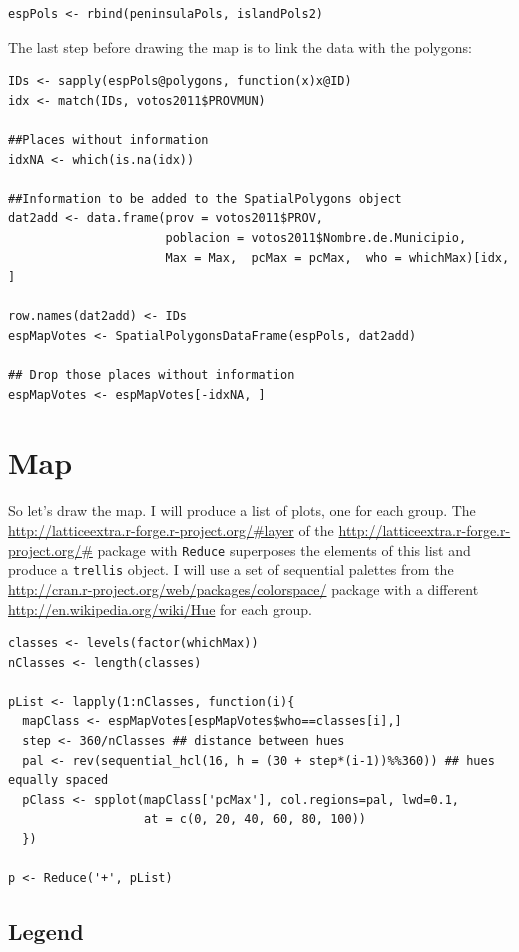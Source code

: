 \lstset{language=R}
\begin{lstlisting}
espPols <- rbind(peninsulaPols, islandPols2)
\end{lstlisting}

The last step before drawing the map is to link the data
with the polygons:

\lstset{language=R}
\begin{lstlisting}
IDs <- sapply(espPols@polygons, function(x)x@ID)
idx <- match(IDs, votos2011$PROVMUN)

##Places without information
idxNA <- which(is.na(idx))

##Information to be added to the SpatialPolygons object
dat2add <- data.frame(prov = votos2011$PROV,
                      poblacion = votos2011$Nombre.de.Municipio,
                      Max = Max,  pcMax = pcMax,  who = whichMax)[idx, ]

row.names(dat2add) <- IDs
espMapVotes <- SpatialPolygonsDataFrame(espPols, dat2add)

## Drop those places without information
espMapVotes <- espMapVotes[-idxNA, ]
\end{lstlisting}
\section{Map}
\label{sec-3}

So let's draw the map. I will produce a list of plots, one for
each group.  The \url{http://latticeextra.r-forge.r-project.org/#layer} of the \url{http://latticeextra.r-forge.r-project.org/#} package
with \texttt{Reduce} superposes the elements of this list and produce a
\texttt{trellis} object. I will use a set of sequential palettes from the
\url{http://cran.r-project.org/web/packages/colorspace/} package with a different \url{http://en.wikipedia.org/wiki/Hue} for each group.


\lstset{language=R}
\begin{lstlisting}
classes <- levels(factor(whichMax))
nClasses <- length(classes)

pList <- lapply(1:nClasses, function(i){
  mapClass <- espMapVotes[espMapVotes$who==classes[i],]
  step <- 360/nClasses ## distance between hues
  pal <- rev(sequential_hcl(16, h = (30 + step*(i-1))%%360)) ## hues equally spaced
  pClass <- spplot(mapClass['pcMax'], col.regions=pal, lwd=0.1,
                   at = c(0, 20, 40, 60, 80, 100))
  })

p <- Reduce('+', pList)
\end{lstlisting}
\subsection{Legend}
\label{sec-3-1}

